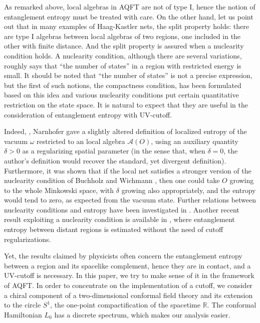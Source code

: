 \documentclass[a4paper,12pt]{article}
\theoremstyle{plain}
\theoremstyle{definition}
\theoremstyle{remark}
\def\RR{{\mathbb R}}
\def\A{{\mathcal A}}
\begin{document}
As remarked above, local algebras in AQFT are not of type I, hence the notion of entanglement entropy must be
treated with care. On the other hand, let us point out that in many examples of Haag-Kastler nets,
the split property holds: there are type I algebras between local algebras of two regions, one included
in the other with finite distance. And the split property is assured when a nuclearity condition holds.
A nuclearity condition, although there are several variations, roughly says that ``the number of states''
in a region with restricted energy is small. It should be noted that ``the number of states'' is not a
precise expression, but the first of such notions, the compactness condition, has been formulated
based on this idea \cite{haaswi65} and various nuclearity conditions put certain quantitative restriction
on the state space. It is natural to expect that they are useful in the consideration of entanglement entropy with
UV-cutoff.

Indeed, \cite{narnhofer94}, Narnhofer
gave a slightly altered definition of localized entropy of
the vacuum $\omega$ restricted to an local algebra $\A(O)$, using an auxiliary quantity $\delta > 0$
as a regularizing spatial parameter (in the sense that, when $\delta =0$,
the author's definition would recover the standard, yet divergent definition).
Furthermore, it was shown that if the local net satisfies a stronger version of the nuclearity condition of Buchholz and Wichmann
\cite{bucwic86}, then one could take $O$ growing to the whole Minkowski space,
with $\delta$ growing also appropriately, and the entropy would tend to zero, as expected from the vacuum state.
Further relations between nuclearity conditions and entropy have been investigated in \cite{narnhofer02}.
Another recent result exploiting a nuclearity condition is available in \cite{HS17},
where entanglement entropy between distant regions is estimated without the need of cutoff regularizations.

Yet, the results claimed by physicists often concern the entanglement entropy between
a region and its spacelike complement, hence they are in contact, and a UV-cutoff is necessary.
In this paper, we try to make sense of it in the framework of AQFT.
In order to concentrate on the implementation of a cutoff, we consider a chiral component
of a two-dimensional conformal field theory and its extension to the circle $S^1$,
the one-point compactification of the spacetime $\RR$.
The conformal Hamiltonian $L_0$ has a discrete spectrum, which makes our analysis easier.
\end{document}
